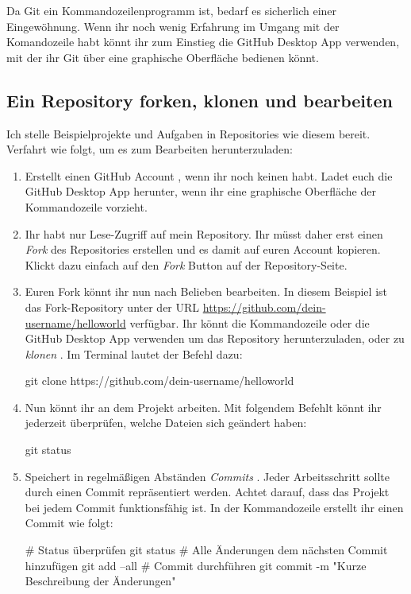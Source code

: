 \documentclass[parskip=half, final]{scrreprt}
\begin{document}
Da Git ein Kommandozeilenprogramm ist, bedarf es sicherlich einer Eingewöhnung. Wenn ihr noch wenig Erfahrung im Umgang mit der Komandozeile habt könnt ihr zum Einstieg die GitHub Desktop App  verwenden, mit der ihr Git über eine graphische Oberfläche bedienen könnt.

\subsection{Ein Repository forken, klonen und bearbeiten}\label{fork_and_clone}

Ich stelle Beispielprojekte und Aufgaben in Repositories wie diesem  bereit. Verfahrt wie folgt, um es zum Bearbeiten herunterzuladen:

\begin{enumerate}

\item Erstellt einen GitHub Account , wenn ihr noch keinen habt. Ladet euch die GitHub Desktop App herunter, wenn ihr eine graphische Oberfläche der Kommandozeile vorzieht.

\item Ihr habt nur Lese-Zugriff auf mein Repository. Ihr müsst daher erst einen \emph{Fork}  des Repositories erstellen und es damit auf euren Account kopieren. Klickt dazu einfach auf den \emph{Fork} Button auf der Repository-Seite.

\item Euren Fork könnt ihr nun nach Belieben bearbeiten. In diesem Beispiel ist das Fork-Repository unter der URL \url{https://github.com/dein-username/helloworld} verfügbar. Ihr könnt die Kommandozeile oder die GitHub Desktop App verwenden um das Repository herunterzuladen, oder zu \emph{klonen} . Im Terminal lautet der Befehl dazu:
\begin{shcode}
git clone https://github.com/dein-username/helloworld
\end{shcode}

\item Nun könnt ihr an dem Projekt arbeiten. Mit folgendem Befehlt könnt ihr jederzeit überprüfen, welche Dateien sich geändert haben:
\begin{shcode}
git status
\end{shcode}

\item Speichert in regelmäßigen Abständen \emph{Commits} . Jeder Arbeitsschritt sollte durch einen Commit repräsentiert werden. Achtet darauf, dass das Projekt bei jedem Commit funktionsfähig ist. In der Kommandozeile erstellt ihr einen Commit wie folgt:
\begin{shcode}
# Status überprüfen
git status
# Alle Änderungen dem nächsten Commit hinzufügen
git add --all
# Commit durchführen
git commit -m "Kurze Beschreibung der Änderungen"
\end{shcode}


\end{enumerate}
\end{document}
